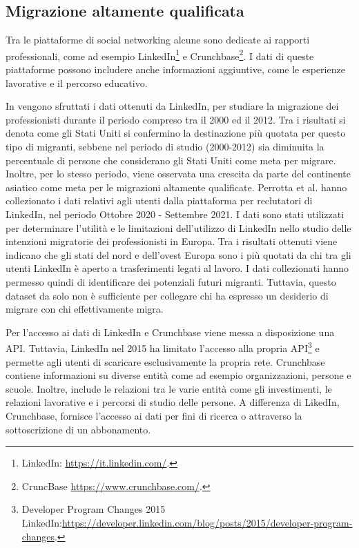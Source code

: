 \subsection{Migrazione altamente qualificata}

Tra le piattaforme di social networking alcune sono dedicate ai rapporti professionali, come ad esempio LinkedIn\footnote{LinkedIn: \url{https://it.linkedin.com/}.} e Crunchbase\footnote{CruncBase \url{https://www.crunchbase.com/}.}. I dati di queste piattaforme possono includere anche informazioni aggiuntive, come le esperienze lavorative e il percorso educativo. 




In \cite{State2014} vengono sfruttati i dati ottenuti da LinkedIn, per studiare la migrazione dei professionisti durante il periodo compreso tra il 2000 ed il 2012. Tra i risultati si denota come gli Stati Uniti si confermino la destinazione più quotata per questo tipo di migranti, sebbene nel periodo di studio (2000-2012) sia diminuita la percentuale di persone che considerano gli Stati Uniti come meta per migrare. Inoltre, per lo stesso periodo, viene osservata una crescita da parte del continente asiatico come meta per le migrazioni altamente qualificate.
Perrotta et al. \cite{Perrotta_Johnson_Theile_Grow_Valk_Zagheni_2022} hanno collezionato i dati relativi agli utenti dalla piattaforma per reclutatori di LinkedIn, nel periodo Ottobre 2020 - Settembre 2021. I dati sono stati utilizzati per determinare l'utilità e le limitazioni dell'utilizzo di LinkedIn nello studio delle intenzioni migratorie dei professionisti in Europa. Tra i risultati ottenuti viene indicano che gli stati del nord e dell'ovest Europa sono i più quotati da chi tra gli utenti LinkedIn è aperto a trasferimenti legati al lavoro. I dati collezionati hanno permesso quindi di identificare dei potenziali futuri migranti. Tuttavia, questo dataset da solo non è sufficiente per collegare chi ha espresso un desiderio di migrare con chi effettivamente migra. 




Per l'accesso ai dati di LinkedIn e Crunchbase viene messa a disposizione una API. Tuttavia, LinkedIn nel 2015 ha limitato l'accesso alla propria API\footnote{ Developer Program Changes 2015 LinkedIn:\url{https://developer.linkedin.com/blog/posts/2015/developer-program-changes}.} e permette agli utenti di scaricare esclusivamente la propria rete.
Crunchbase contiene informazioni su diverse entità come ad esempio organizzazioni, persone e scuole. Inoltre, include le relazioni tra le varie entità come gli investimenti, le relazioni lavorative e i percorsi di studio delle persone.
A differenza di LikedIn, Crunchbase, fornisce l'accesso ai dati per fini di ricerca o attraverso la sottoscrizione di un abbonamento. 



